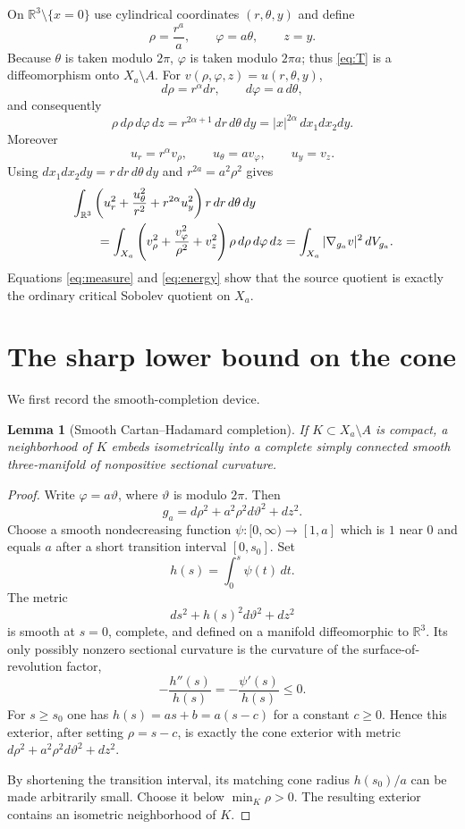 \documentclass[11pt]{article}
\newtheorem{lemma}{Lemma}
\newcommand{\R}{\mathbb R}
\begin{document}
On $\R^3\setminus\{x=0\}$ use cylindrical coordinates $(r,\theta,y)$ and
define
\begin{equation}\label{eq:T}
 \rho=\frac{r^a}{a},\qquad \varphi=a\theta,\qquad z=y.
\end{equation}
Because $\theta$ is taken modulo $2\pi$, $\varphi$ is taken modulo $2\pi a$;
thus \eqref{eq:T} is a diffeomorphism onto $X_a\setminus A$.
For $v(\rho,\varphi,z)=u(r,\theta,y)$,
\[
 d\rho=r^\alpha dr,\qquad d\varphi=a\,d\theta,
\]
and consequently
\begin{equation}\label{eq:measure}
 \rho\,d\rho\,d\varphi\,dz
 =r^{2\alpha+1}\,dr\,d\theta\,dy
 =|x|^{2\alpha}\,dx_1dx_2dy.
\end{equation}
Moreover
\[
 u_r=r^\alpha v_\rho,\qquad u_\theta=a v_\varphi,\qquad u_y=v_z.
\]
Using $dx_1dx_2dy=r\,dr\,d\theta\,dy$ and
$r^{2a}=a^2\rho^2$ gives
\begin{align}
 &\int_{\R^3}
 \left(u_r^2+\frac{u_\theta^2}{r^2}+r^{2\alpha}u_y^2\right)
 r\,dr\,d\theta\,dy \notag\\
 &\qquad=
 \int_{X_a}\left(v_\rho^2+\frac{v_\varphi^2}{\rho^2}+v_z^2\right)
 \rho\,d\rho\,d\varphi\,dz
 =\int_{X_a}|\nabla_{g_a}v|^2\,dV_{g_a}.             \label{eq:energy}
\end{align}
Equations \eqref{eq:measure} and \eqref{eq:energy} show that the source
quotient is exactly the ordinary critical Sobolev quotient on $X_a$.

\section*{The sharp lower bound on the cone}

We first record the smooth-completion device.

\begin{lemma}[Smooth Cartan--Hadamard completion]\label{lem:smooth}
If $K\subset X_a\setminus A$ is compact, a neighborhood of $K$ embeds
isometrically into a complete simply connected smooth three-manifold of
nonpositive sectional curvature.
\end{lemma}

\begin{proof}
Write $\varphi=a\vartheta$, where $\vartheta$ is modulo $2\pi$.  Then
\[
 g_a=d\rho^2+a^2\rho^2d\vartheta^2+dz^2.
\]
Choose a smooth nondecreasing function $\psi:[0,\infty)\to[1,a]$ which is
$1$ near $0$ and equals $a$ after a short transition interval $[0,s_0]$.
Set
\[
 h(s)=\int_0^s\psi(t)\,dt.
\]
The metric
\[
 ds^2+h(s)^2d\vartheta^2+dz^2
\]
is smooth at $s=0$, complete, and defined on a manifold diffeomorphic to
$\R^3$.  Its only possibly nonzero sectional curvature is the curvature of
the surface-of-revolution factor,
\[
 -\frac{h''(s)}{h(s)}=-\frac{\psi'(s)}{h(s)}\le0.
\]
For $s\ge s_0$ one has $h(s)=as+b=a(s-c)$ for a constant $c\ge0$.
Hence this exterior, after setting $\rho=s-c$, is exactly the cone exterior
with metric $d\rho^2+a^2\rho^2d\vartheta^2+dz^2$.

By shortening the transition interval, its matching cone radius
$h(s_0)/a$ can be made arbitrarily small.  Choose it below
$\min_K\rho>0$.  The resulting exterior contains an isometric neighborhood
of $K$.
\end{proof}
\end{document}

